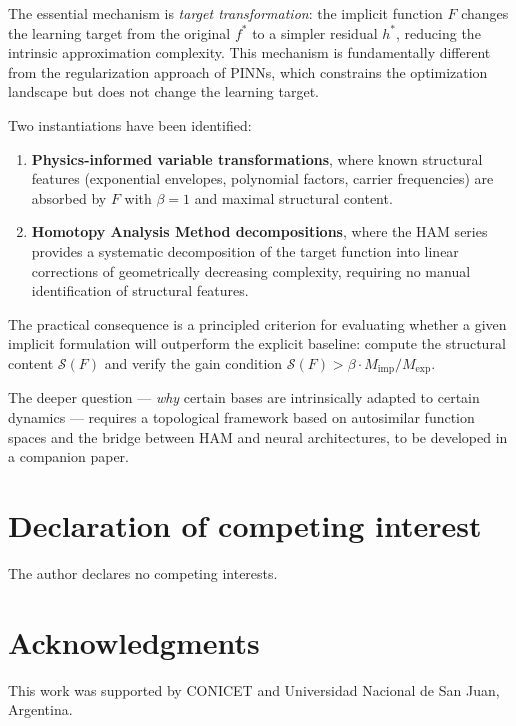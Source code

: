 \documentclass[12pt]{article}
\begin{document}
The essential mechanism is \emph{target transformation}: the
implicit function $F$ changes the learning target from the original
$f^*$ to a simpler residual $h^*$, reducing the intrinsic
approximation complexity.
This mechanism is fundamentally different from the regularization
approach of PINNs, which constrains the optimization landscape but
does not change the learning target.

Two instantiations have been identified:
\begin{enumerate}
  \item \textbf{Physics-informed variable transformations}, where
    known structural features (exponential envelopes, polynomial
    factors, carrier frequencies) are absorbed by $F$ with
    $\beta = 1$ and maximal structural content.
  \item \textbf{Homotopy Analysis Method decompositions}, where the
    HAM series provides a systematic decomposition of the target
    function into linear corrections of geometrically decreasing
    complexity, requiring no manual identification of structural
    features.
\end{enumerate}

The practical consequence is a principled criterion for evaluating
whether a given implicit formulation will outperform the explicit
baseline: compute the structural content $\mathcal{S}(F)$ and verify
the gain condition $\mathcal{S}(F) > \beta \cdot M_{\mathrm{imp}} /
M_{\mathrm{exp}}$.

The deeper question --- \emph{why} certain bases are intrinsically
adapted to certain dynamics --- requires a topological framework
based on autosimilar function spaces and the bridge between HAM and
neural architectures, to be developed in a companion paper.

\section*{Declaration of competing interest}
The author declares no competing interests.

\section*{Acknowledgments}
This work was supported by CONICET and Universidad Nacional de San
Juan, Argentina.
\end{document}
